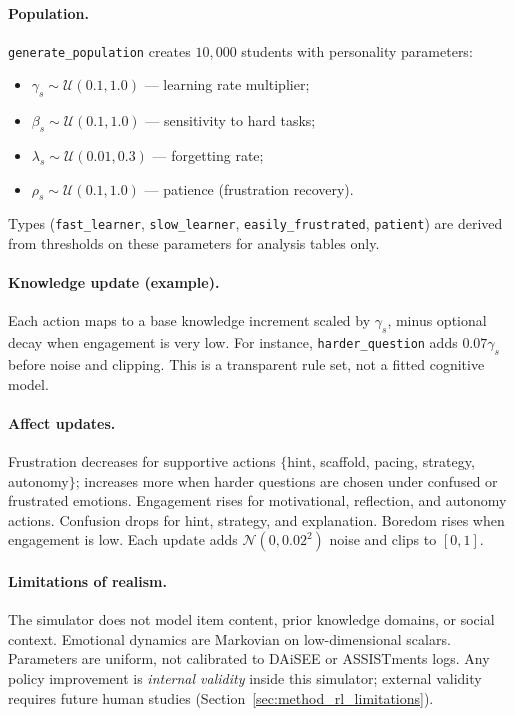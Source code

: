 \paragraph{Population.}
\texttt{generate\_population} creates $10{,}000$ students with personality parameters:
\begin{itemize}
    \item $\gamma_s \sim \mathcal{U}(0.1, 1.0)$ --- learning rate multiplier;
    \item $\beta_s \sim \mathcal{U}(0.1, 1.0)$ --- sensitivity to hard tasks;
    \item $\lambda_s \sim \mathcal{U}(0.01, 0.3)$ --- forgetting rate;
    \item $\rho_s \sim \mathcal{U}(0.1, 1.0)$ --- patience (frustration recovery).
\end{itemize}
Types (\texttt{fast\_learner}, \texttt{slow\_learner}, \texttt{easily\_frustrated}, \texttt{patient}) are derived from thresholds on these parameters for analysis tables only.

\paragraph{Knowledge update (example).}
Each action maps to a base knowledge increment scaled by $\gamma_s$, minus optional decay when engagement is very low. For instance, \texttt{harder\_question} adds $0.07 \gamma_s$ before noise and clipping. This is a transparent rule set, not a fitted cognitive model.

\paragraph{Affect updates.}
Frustration decreases for supportive actions $\{$hint, scaffold, pacing, strategy, autonomy$\}$; increases more when harder questions are chosen under confused or frustrated emotions. Engagement rises for motivational, reflection, and autonomy actions. Confusion drops for hint, strategy, and explanation. Boredom rises when engagement is low. Each update adds $\mathcal{N}(0, 0.02^2)$ noise and clips to $[0,1]$.

\paragraph{Limitations of realism.}
The simulator does not model item content, prior knowledge domains, or social context. Emotional dynamics are Markovian on low-dimensional scalars. Parameters are uniform, not calibrated to DAiSEE or ASSISTments logs. Any policy improvement is \emph{internal validity} inside this simulator; external validity requires future human studies (Section~\ref{sec:method_rl_limitations}).

